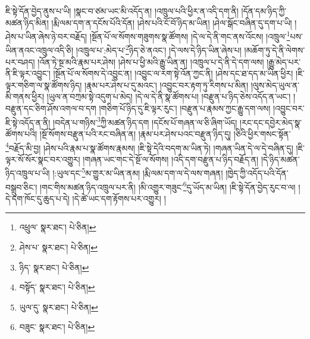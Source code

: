ཇི་སྟེ་དོན་བྱེད་ནུས་པ་ཡི། །སྣང་བ་ཙམ་ཡང་མི་འདོད་ན། །འཁྲུལ་པའི་ཕྱིར་ན་འདི་དག་ནི། །དོན་དམ་ཉིད་ཀྱི་མཚན་ཉིད་མིན། །རྨི་ལམ་དག་ན་དངོས་པོའི་དོན། །ཤེས་པའི་ངོ་བོ་ཉིད་མ་ཡིན། །ཤེལ་སྒོང་བཞིན་དུ་དག་པ་ཡི། །ཤེས་པ་ཡིན་ཞེས་ཉེ་བར་བརྗོད། །སྔོན་པོ་ལ་སོགས་གཟུགས་སྣ་ཚོགས། །དེ་ལ་དེ་ནི་གང་ནས་འོངས། །འཁྲུལ་\footnote{འཕྲུལ་  སྣར་ཐང་།  པེ་ཅིན། }པས་ཡིན་ནའང་འཁྲུལ་འདི་ཅི། །འཁྲུལ་པ་:མེད་པ་\footnote{ཤེས་པ་  སྣར་ཐང་།  པེ་ཅིན། }ཉིད་ཅེ་ནའང་། །དེ་ལས་དེ་ཉིད་ཡིན་ཞེས་པ། །མཆོག་ཏུ་དེ་ནི་ལེགས་པར་བཤད། །འོན་ཏེ་སྔ་མའི་རྣམ་པར་ཤེས། །ཤེས་པ་ཕྱི་མའི་རྒྱུ་ཡིན་ན། །འཁྲུལ་པ་དེ་ནི་དེ་དག་ལས། །རྒྱུ་མེད་པར་ནི་ཇི་ལྟར་འབྱུང་། །སྔོན་པོ་ལ་སོགས་དེ་འབྱུང་ན། །འབྱུང་ལ་རག་སྟེ་འོན་ཀྱང་ནི། །ཤེས་དང་ཐ་དད་མ་ཡིན་ཕྱིར། །ཇི་ལྟར་གཅིག་ལ་སྣ་ཚོགས་ཉིད། །རྣམ་པར་ཤེས་པ་དུ་མའང་། །འབྱུང་བར་རྟག་ཏུ་རིགས་པ་མིན། །ལུས་མེད་ཡུལ་ན་མི་གནས་ཕྱིར། །ཡུལ་ན་བཀྲམ་སྟེ་འདུག་པ་མེད། །དེ་ལ་དེ་ནི་སྣ་ཚོགས་པ། །བརྫུན་པ་ཉིད་ཅེས་འདོད་ན་ཡང་། །བརྫུན་དང་ཅིག་ཤོས་འགལ་བ་དག །གཅིག་པོ་ཉིད་དུ་ཇི་ལྟར་རུང་། །བརྫུན་པ་རྣམས་ཀྱང་རྒྱུ་དག་ལས། །འབྱུང་བར་ཇི་སྟེ་འདོད་ན་ནི། །བདེན་པ་གཉིས་\footnote{ཉིད་  སྣར་ཐང་།  པེ་ཅིན། }ཀྱི་མཚན་ཉིད་དག །དངོས་པོ་གཞན་ལ་ཅི་ཞིག་ཡོད། །རང་དང་དབྱེར་མེད་སྣ་ཚོགས་པའི། །སྔོ་སོགས་བརྫུན་པའི་རང་བཞིན་ན། །རྣམ་པར་ཤེས་པའང་བརྫུན་ཉིད་དུ། །ཅིའི་ཕྱིར་གསང་སྟོན་\footnote{བསྟོད་  སྣར་ཐང་།  པེ་ཅིན། }བརྗོད་མི་བྱ། །ཤེས་པའི་རྣམ་པ་སྣ་ཚོགས་རྣམས། །ཇི་སྟེ་དེའི་བདག་མ་ཡིན་ཏེ། །གཞན་ཡིན་དེ་ལ་དེ་བཞིན་དུ། །ཇི་ལྟར་སོ་སོར་སྣང་བར་འགྱུར། །གཞན་ཡང་གང་དེ་སྔོ་ལ་སོགས། །འདི་དག་བརྫུན་པ་ཉིད་བརྗོད་ན། །དེ་ཉིད་མཚན་ཉིད་འཁྲུལ་པ་ཡི། །:ཡུལ་དང་\footnote{ཡུལ་དུ་  སྣར་ཐང་།  པེ་ཅིན། }མ་གྱུར་མ་ཡིན་ནམ། །རྨི་ལམ་དག་ལ་དེ་ལས་གཞན། །ཁྱེད་ཀྱི་འདོད་པའི་དོན་བསྒྲུབ་ཅིང་། །གང་གིས་མཚན་ཉིད་འཁྲུལ་པར་ནི། །མི་འགྱུར་གཟུང་\footnote{བཟུང་  སྣར་ཐང་།  པེ་ཅིན། }དུ་ཡོད་མ་ཡིན། །ཇི་སྟེ་དོན་བྱེད་རུང་བ་ལ། །དེ་དག་ཁོང་དུ་ཆུད་པ་དེ། །དེ་ཚེ་ཡང་དག་རྟོགས་པར་འགྱུར། །
